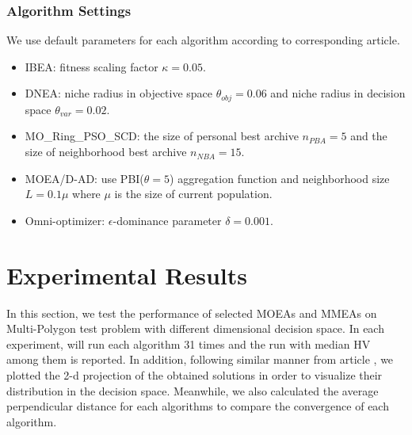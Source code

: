 \documentclass[conference]{IEEEtran}
\begin{document}
\subsubsection{Algorithm Settings}
We use default parameters for each algorithm according to corresponding article.
\begin{itemize}
    \item IBEA: fitness scaling factor $\kappa=0.05$.
    \item DNEA: niche radius in objective space $\theta_{obj}=0.06$ and niche radius in decision space $\theta_{var}=0.02$.
    \item MO\_Ring\_PSO\_SCD: the size of personal best archive $n_{PBA}=5$ and the size of neighborhood best archive $n_{NBA}=15$.
    \item MOEA/D-AD: use PBI($\theta=5$) aggregation function and neighborhood size $L = 0.1\mu$ where $\mu$ is the size of current population.
    \item Omni-optimizer: $\epsilon$-dominance parameter $\delta=0.001$.
\end{itemize}

\section{Experimental Results}
\label{Experimental Results}
In this section, we test the performance of selected MOEAs and MMEAs on Multi-Polygon test problem with different dimensional decision space. In each experiment, will run each algorithm 31 times and the run with median HV among them is reported. In addition, following similar manner from article \cite{Hisao}, we plotted the 2-d projection of the obtained solutions in order to visualize their distribution in the decision space. Meanwhile, we also calculated the average perpendicular distance for each algorithms to compare the convergence of each algorithm. 
\end{document}
